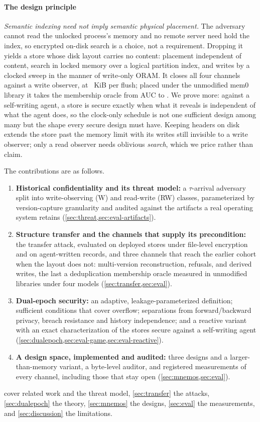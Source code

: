 \paragraph{The design principle}
\emph{Semantic indexing need not imply semantic physical placement.} The adversary cannot read the
unlocked process's memory and no remote server need hold the index, so encrypted on-disk search is a
choice, not a requirement. Dropping it yields a store whose disk layout carries no content: placement independent
of content, search in locked memory over a logical partition index, and writes by a clocked sweep in
the manner of write-only ORAM. It closes all four channels against a write observer, at
\REtwentyoneSweepKiB~KiB per flush; placed under the unmodified mem0 library it takes the
membership oracle from AUC \REtwentynineQdrantPt{} to \REtwentynineMStorePt. We prove more: against a self-writing agent, a store is secure
exactly when what it reveals is independent of what the agent does, so the clock-only schedule is
not one sufficient design among many but the shape every secure design must have. Keeping headers on
disk extends the store past the memory limit with its writes still invisible to a write observer;
only a read observer needs oblivious \emph{search}, which we price rather than claim.

The contributions are as follows.
\begin{enumerate}
\item \textbf{Historical confidentiality and its threat model:} a $\tau$-arrival adversary split
into write-observing (W) and read-write (RW) classes, parameterized by version-capture granularity
and audited against the artifacts a real operating system retains
(\cref{sec:threat,sec:eval-artifacts}).
\item \textbf{Structure transfer and the channels that supply its precondition:} the transfer
attack, evaluated on deployed stores under file-level encryption and on agent-written records, and
three channels that reach the earlier cohort when the layout does not: multi-version
reconstruction, refusals, and derived writes, the last a deduplication membership oracle
measured in unmodified libraries under four models (\cref{sec:transfer,sec:eval}).
\item \textbf{Dual-epoch security:} an adaptive, leakage-parameterized definition; sufficient
conditions that cover overflow; separations from forward/backward privacy, breach resistance and
history independence; and a reactive variant with an exact characterization of the stores secure
against a self-writing agent (\cref{sec:dualepoch,sec:eval-game,sec:eval-reactive}).
\item \textbf{A design space, implemented and audited:} three designs and a larger-than-memory
variant, a byte-level auditor, and registered measurements of every channel, including those that
stay open (\cref{sec:mnemos,sec:eval}).
\end{enumerate}

 cover related work and the threat model, \cref{sec:transfer}
the attacks, \cref{sec:dualepoch} the theory, \cref{sec:mnemos} the designs, \cref{sec:eval} the
measurements, and \cref{sec:discussion} the limitations.
